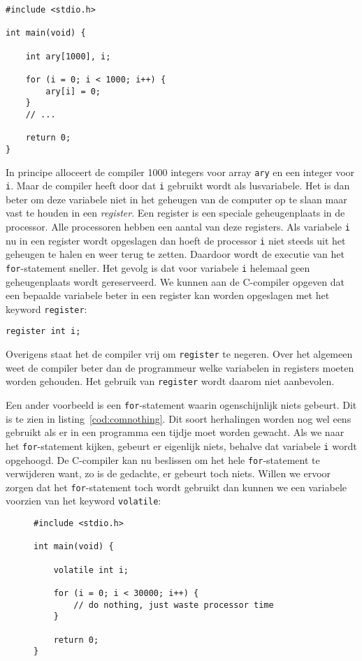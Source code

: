 \begin{lstlisting}[caption=Een C-programma.,label=cod:comclearary]
#include <stdio.h>

int main(void) {

    int ary[1000], i;
    
    for (i = 0; i < 1000; i++) {
        ary[i] = 0;
    }
    // ...
    
    return 0;
}
\end{lstlisting}

In principe alloceert de compiler 1000 integers voor array \texttt{ary} en een integer voor \texttt{i}. Maar de compiler heeft door dat \texttt{i} gebruikt wordt als lusvariabele. Het is dan beter om deze variabele niet in het geheugen van de computer op te slaan maar vast te houden in een \textsl{register}. Een register is een speciale geheugenplaats in de processor. Alle processoren hebben een aantal van deze registers. Als variabele \texttt{i} nu in een register wordt opgeslagen dan hoeft de processor \texttt{i} niet steeds uit het geheugen te halen en weer terug te zetten. Daardoor wordt de executie van het \texttt{for}-statement sneller. Het gevolg is dat voor variabele \texttt{i} helemaal geen geheugenplaats wordt gereserveerd. We kunnen aan de C-compiler opgeven dat een bepaalde variabele beter in een register kan worden opgeslagen met het keyword \texttt{register}:

\hspace*{1em}\texttt{register int i;}

Overigens staat het de compiler vrij om \texttt{register} te negeren. Over het algemeen weet de compiler beter dan de programmeur welke variabelen in registers moeten worden gehouden. Het gebruik van \texttt{register} wordt daarom niet aanbevolen.

Een ander voorbeeld is een \texttt{for}-statement waarin ogenschijnlijk niets gebeurt. Dit is te zien in listing~\ref{cod:comnothing}.
Dit soort herhalingen worden nog wel eens gebruikt als er in een programma een tijdje moet worden gewacht. Als we naar het \texttt{for}-statement kijken, gebeurt er eigenlijk niets, behalve dat variabele \texttt{i} wordt opgehoogd. De C-compiler kan nu beslissen om het hele \texttt{for}-statement te verwijderen want, zo is de gedachte, er gebeurt toch niets. Willen we ervoor zorgen dat het \texttt{for}-statement toch wordt gebruikt dan kunnen we een variabele voorzien van het keyword \texttt{volatile}:

\begin{figure}[!ht]
\begin{lstlisting}[caption=Een C-programma.,label=cod:comnothing]
#include <stdio.h>

int main(void) {

    volatile int i;
    
    for (i = 0; i < 30000; i++) {
        // do nothing, just waste processor time
    }
    
    return 0;
}
\end{lstlisting}
\end{figure}

